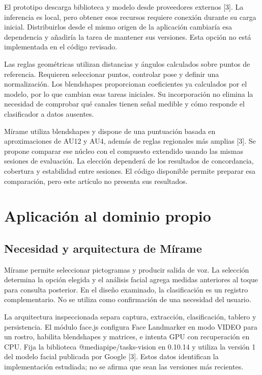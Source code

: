 \documentclass[conference,letterpaper]{IEEEtran}
\begin{document}
El prototipo descarga biblioteca y modelo desde proveedores externos [3]. La inferencia es local, pero obtener esos recursos requiere conexión durante su carga inicial. Distribuirlos desde el mismo origen de la aplicación cambiaría esa dependencia y añadiría la tarea de mantener sus versiones. Esta opción no está implementada en el código revisado.

Las reglas geométricas utilizan distancias y ángulos calculados sobre puntos de referencia. Requieren seleccionar puntos, controlar pose y definir una normalización. Los blendshapes proporcionan coeficientes ya calculados por el modelo, por lo que cambian esas tareas iniciales. Su incorporación no elimina la necesidad de comprobar qué canales tienen señal medible y cómo responde el clasificador a datos ausentes.

Mírame utiliza blendshapes y dispone de una puntuación basada en aproximaciones de AU12 y AU4, además de reglas regionales más amplias [3]. Se propone comparar ese núcleo con el compuesto extendido usando las mismas sesiones de evaluación. La elección dependerá de los resultados de concordancia, cobertura y estabilidad entre sesiones. El código disponible permite preparar esa comparación, pero este artículo no presenta sus resultados.


\section{Aplicación al dominio propio}

\subsection{Necesidad y arquitectura de Mírame}
Mírame permite seleccionar pictogramas y producir salida de voz. La selección determina la opción elegida y el análisis facial agrega medidas anteriores al toque para consulta posterior. En el diseño examinado, la clasificación es un registro complementario. No se utiliza como confirmación de una necesidad del usuario.

La arquitectura inspeccionada separa captura, extracción, clasificación, tablero y persistencia. El módulo face.js configura Face Landmarker en modo VIDEO para un rostro, habilita blendshapes y matrices, e intenta GPU con recuperación en CPU. Fija la biblioteca @mediapipe/tasks-vision en 0.10.14 y utiliza la versión 1 del modelo facial publicada por Google [3]. Estos datos identifican la implementación estudiada; no se afirma que sean las versiones más recientes.
\end{document}
